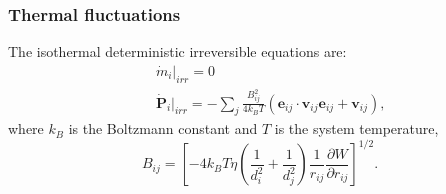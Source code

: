\begin{frame}
  \frametitle{Thermal fluctuations}
The isothermal deterministic irreversible equations are:
\begin{eqnarray}\label{equ:thermalfur}
  & &\dot{m}_i\vert_{irr}=0  \nonumber \\
& &\dot{\mathbf{P}}_i\vert_{irr}=-\sum_j\frac{B_{ij}^2}{4k_BT}
(\mathbf{e}_{ij}\cdot\mathbf{v}_{ij}\mathbf{e}_{ij}+\mathbf{v}_{ij}),
\end{eqnarray}
where $k_B$ is the Boltzmann constant and $T$ is the system temperature, 
\begin{equation}\label{equ:b}
 B_{ij}=[-4k_BT\eta\left(\frac{1}{d_{i}^{2}}+\frac{1}{d_{j}^{2}}\right)\frac{1}{r_{ij}}\frac{\partial W}{\partial r_{ij}}]^{1/2}.
\end{equation}
\end{frame}

